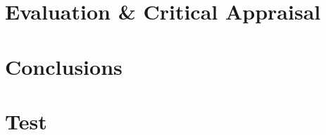 \documentclass[11pt,openright,twoside,a4paper]{report}
\begin{document}
\chapter{Evaluation \& Critical Appraisal}
\label{ch:chapter7}


\chapter{Conclusions}
\label{ch:chapter8}




\let\cleardoublepage\clearpage %
\appendix

\chapter{Test}
\label{ch:appendix-test}

\end{document}
